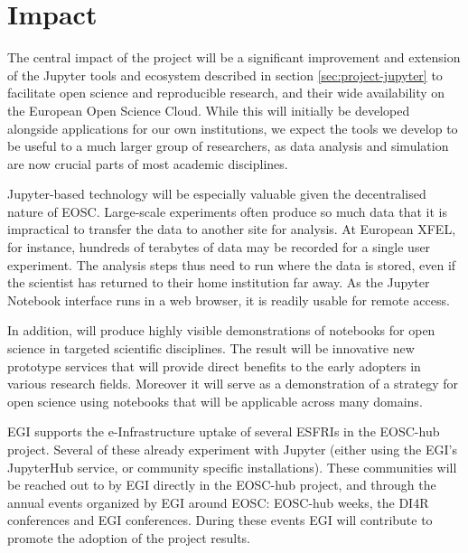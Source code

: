 

\section{Impact}
\label{sec:impact}

The central impact of the \TheProject project will be a significant improvement
and extension of the Jupyter tools and ecosystem described in section \ref{sec:project-jupyter}
to facilitate open science and reproducible research,
and their wide availability on the European Open Science Cloud.
While this will initially be developed alongside applications for our
own institutions, we expect the tools we develop to be useful to a much larger
group of researchers, as data analysis and simulation are now crucial parts
of most academic disciplines.

Jupyter-based technology will be especially valuable given the decentralised
nature of EOSC. Large-scale experiments often produce so much data that it is
impractical to transfer the data to another site for analysis.
At European XFEL, for instance, hundreds of terabytes of data may be recorded
for a single user experiment. The analysis steps thus need to run where the
data is stored, even if the scientist has returned to their home institution
far away. As the Jupyter Notebook interface runs in a web browser,
it is readily usable for remote access.

In addition, \TheProject will produce highly visible demonstrations of
notebooks for open science in targeted scientific disciplines.
The result will be innovative new prototype services that will provide
direct benefits to the early adopters in various research fields.
Moreover it will serve as a demonstration of a strategy for open science
using notebooks that will be applicable across many domains.

EGI supports the e-Infrastructure uptake of several ESFRIs in the EOSC-hub project.
Several of these already experiment with Jupyter (either using the EGI's JupyterHub
service, or community specific installations). These communities will
be reached out to by
EGI directly in the EOSC-hub project, and through the annual events organized by EGI
around EOSC: EOSC-hub weeks, the DI4R conferences and EGI conferences. During these
events EGI will contribute to promote the adoption of the project results.

